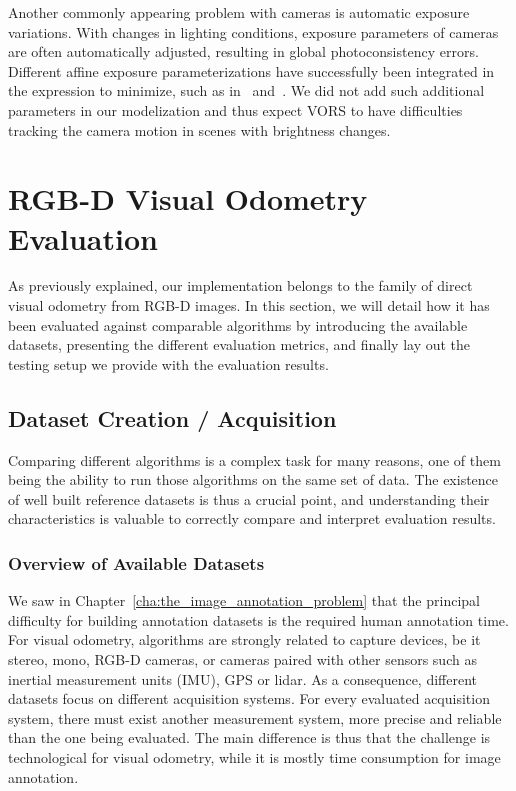 Another commonly appearing problem with cameras is automatic exposure variations.
With changes in lighting conditions,
exposure parameters of cameras are often automatically adjusted,
resulting in global photoconsistency errors.
Different affine exposure parameterizations have successfully been integrated
in the expression to minimize, such as in~\cite{klose2013efficient} and~\cite{engel2017direct}.
We did not add such additional parameters in our modelization
and thus expect VORS to have difficulties tracking the camera motion
in scenes with brightness changes.


\section{RGB-D Visual Odometry Evaluation}%
\label{sec:rgbd-vo-evaluation}

As previously explained, our implementation
belongs to the family of direct visual odometry from RGB-D images.
In this section, we will detail how it has been evaluated against
comparable algorithms by introducing the available datasets,
presenting the different evaluation metrics,
and finally lay out the testing setup we provide with the evaluation results.

\subsection{Dataset Creation / Acquisition}%
\label{sub:dataset_creation}

Comparing different algorithms is a complex task for many reasons,
one of them being the ability to run those algorithms on the same set of data.
The existence of well built reference datasets is thus a crucial point,
and understanding their characteristics is valuable to correctly compare and interpret
evaluation results.

\subsubsection{Overview of Available Datasets}%
\label{ssub:datasets_overview}

We saw in Chapter~\ref{cha:the_image_annotation_problem} that the principal
difficulty for building annotation datasets is the required human annotation time.
For visual odometry, algorithms are strongly related to capture devices,
be it stereo, mono, RGB-D cameras, or cameras paired with other sensors
such as inertial measurement units (IMU), GPS or lidar.
As a consequence, different datasets focus on different acquisition systems.
For every evaluated acquisition system, there must exist another measurement system,
more precise and reliable than the one being evaluated.
The main difference is thus that
the challenge is technological for visual odometry,
while it is mostly time consumption for image annotation.

